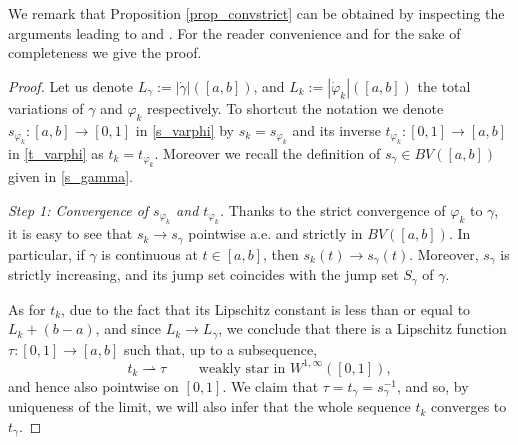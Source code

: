 \documentclass[a4paper,11pt]{article}
\numberwithin{equation}{section}
\begin{document}
 We remark that Proposition \ref{prop_convstrict} can be obtained by inspecting the arguments leading to \cite[Lemma 2.10]{C} and \cite[Lemma 2.7]{BCS2}. For the reader convenience and for the sake of completeness we give the proof. 
\begin{proof}
	Let us denote $L_\gamma:=|\dot\gamma|([a,b])$, and $L_k:=|\dot \varphi_k|([a,b])$ the total variations of $\gamma$ and $\varphi_k$ respectively. To shortcut the notation we denote $s_{\varphi_k}:[a,b]\rightarrow [0,1]$ in \eqref{s_varphi} by $s_k=s_{\varphi_k}$ and its inverse $t_{\varphi_k}:[0,1]\rightarrow [a,b]$ in \eqref{t_varphi} as $t_k=t_{\varphi_k}$. Moreover we recall the definition of $s_\gamma\in BV([a,b])$ given in \eqref{s_gamma}.
	
	\textit{Step 1: Convergence of $s_{\varphi_k}$ and $t_{\varphi_k}$.} Thanks to the strict convergence of $\varphi_k$ to $\gamma$, it is easy to see that $s_k\rightarrow  s_\gamma$ pointwise a.e. and strictly in $BV([a,b])$. In particular, if $\gamma$ is continuous at $t\in[a,b]$, then $s_k(t)\rightarrow s_\gamma(t)$. 
	Moreover, $s_\gamma$ is strictly increasing, and its jump set coincides with the jump set $S_\gamma$ of $\gamma$.
	
	As for $t_k$, due to the fact that its Lipschitz constant is less than or equal to $L_k+(b-a)$, and since $L_k\rightarrow L_\gamma$, we conclude that there is a Lipschitz function $\tau:[0,1]\rightarrow [a,b]$ such that, up to a subsequence, 
	$$t_k\rightharpoonup \tau\qquad \text{ weakly star in }W^{1,\infty}([0,1]),$$
	and hence also pointwise on $[0,1]$. We claim that $\tau=t_\gamma=s_\gamma^{-1}$, and so, by uniqueness of the limit, we will also infer that the whole sequence $t_k$ converges to $t_\gamma$.   
	

\end{proof}
\end{document}
